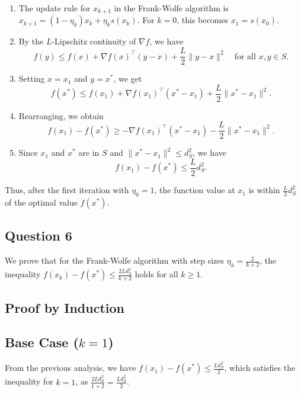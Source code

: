 \documentclass[12p]{article}
\begin{document}
\begin{enumerate}
    \item The update rule for \( x_{k+1} \) in the Frank-Wolfe algorithm is \( x_{k+1} = (1 - \eta_k) x_k + \eta_k s(x_k) \). For \( k = 0 \), this becomes \( x_1 = s(x_0) \).

    \item By the \( L \)-Lipschitz continuity of \( \nabla f \), we have
    \[ f(y) \leq f(x) + \nabla f(x)^\top (y - x) + \frac{L}{2} \|y - x\|^2 \quad \text{for all } x, y \in S. \]

    \item Setting \( x = x_1 \) and \( y = x^* \), we get
    \[ f(x^*) \leq f(x_1) + \nabla f(x_1)^\top (x^* - x_1) + \frac{L}{2} \|x^* - x_1\|^2. \]

    \item Rearranging, we obtain
    \[ f(x_1) - f(x^*) \geq - \nabla f(x_1)^\top (x^* - x_1) - \frac{L}{2} \|x^* - x_1\|^2. \]

    \item Since \( x_1 \) and \( x^* \) are in \( S \) and \( \|x^* - x_1\|^2 \leq d_S^2 \), we have
    \[ f(x_1) - f(x^*) \leq \frac{L}{2} d_S^2. \]
\end{enumerate}

Thus, after the first iteration with \( \eta_0 = 1 \), the function value at \( x_1 \) is within \( \frac{L}{2} d_S^2 \) of the optimal value \( f(x^*) \).



\subsection*{Question 6} 

We prove that for the Frank-Wolfe algorithm with step sizes \( \eta_k = \frac{2}{k+2} \), the inequality \( f(x_k) - f(x^*) \leq \frac{2Ld^2_S}{k+2} \) holds for all \( k \geq 1 \).

\subsection*{Proof by Induction}

\subsection*{Base Case (\( k = 1 \))}
From the previous analysis, we have \( f(x_1) - f(x^*) \leq \frac{Ld^2_S}{2} \), which satisfies the inequality for \( k = 1 \), as \( \frac{2Ld^2_S}{1+2} = \frac{Ld^2_S}{2} \).
\end{document}
